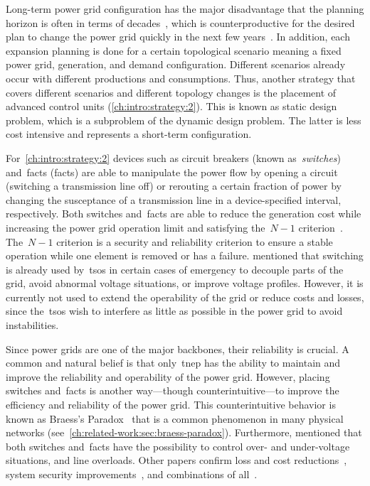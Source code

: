 Long-term power grid configuration has the major disadvantage that the planning
horizon is often in terms of
decades~\parencite{online:europe:TYNDP-2018-Projects-Sheets-166}, which is
counterproductive for the desired plan to change the power grid quickly in the
next few years~\parencite{online:eeg2014}. In addition, each expansion planning
is done for a certain topological scenario meaning a fixed power grid,
generation, and demand configuration. Different scenarios already occur with
different productions and consumptions. Thus, another strategy that covers
different scenarios and different topology changes is the placement of advanced
control units (\cref{ch:intro:strategy:2}). This is known as static design
problem, which is a subproblem of the dynamic design problem. The latter is less
cost intensive and represents a short-term configuration.

For~\cref{ch:intro:strategy:2} devices such as circuit breakers (known
as~\emph{switches}) and~\acrlong{facts} (\gls{facts}) are able to manipulate the
power flow by opening a circuit (switching a transmission line off) or rerouting
a certain fraction of power by changing the susceptance of a transmission line
in a device-specified interval, respectively. Both switches and~\gls{facts} are
able to reduce the generation cost while increasing the power grid operation
limit and satisfying the~$N-1$ criterion~\parencite{LiG13}. The~$N-1$ criterion
is a security and reliability criterion to ensure a stable operation while one
element is removed or has a failure. \textcite{Fis08} mentioned that switching
is already used by~\gls{tso}s in certain cases of emergency to decouple parts of
the grid, avoid abnormal voltage situations, or improve voltage profiles.
However, it is currently not used to extend the operability of the grid or
reduce costs and losses, since the~\gls{tso}s wish to interfere as little as
possible in the power grid to avoid instabilities.

Since power grids are one of the major backbones, their reliability is crucial.
A common and natural belief is that only~\gls{tnep} has the ability to maintain
and improve the reliability and operability of the power grid. However, placing
switches and~\gls{facts} is another way---though counterintuitive---to improve
the efficiency and reliability of the power grid. This counterintuitive behavior
is known as Braess's Paradox~\parencite{Bra68,Bra05} that is a common phenomenon
in many physical networks (see~\cref{ch:related-work:sec:braess-paradox}).
Furthermore, \textcite{Sch90} mentioned that both switches and~\gls{facts} have
the possibility to control over- and under-voltage situations, and line
overloads. Other papers confirm loss and cost reductions~\parencite{Sch90},
system security improvements~\parencite{Sch88}, and combinations of
all~\parencite{Hed11}.

